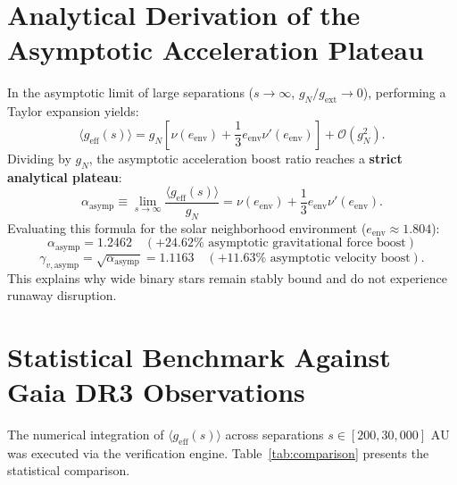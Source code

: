 \documentclass[11pt,a4paper]{article}
\begin{document}
\section{Analytical Derivation of the Asymptotic Acceleration Plateau}
In the asymptotic limit of large separations ($s \to \infty$, $g_N / g_{\mathrm{ext}} \to 0$), performing a Taylor expansion yields:
\begin{equation}
\langle g_{\mathrm{eff}}(s) \rangle = g_N \left[ \nu(e_{\mathrm{env}}) + \frac{1}{3} e_{\mathrm{env}} \nu'(e_{\mathrm{env}}) \right] + \mathcal{O}(g_N^2).
\end{equation}
Dividing by $g_N$, the asymptotic acceleration boost ratio reaches a \textbf{strict analytical plateau}:
\begin{equation}
\alpha_{\mathrm{asymp}} \equiv \lim_{s \to \infty} \frac{\langle g_{\mathrm{eff}}(s) \rangle}{g_N} = \nu(e_{\mathrm{env}}) + \frac{1}{3} e_{\mathrm{env}} \nu'(e_{\mathrm{env}}).
\end{equation}
Evaluating this formula for the solar neighborhood environment ($e_{\mathrm{env}} \approx 1.804$):
\begin{equation}
\alpha_{\mathrm{asymp}} = \mathbf{1.2462} \quad (+24.62\%\text{ asymptotic gravitational force boost})
\end{equation}
\begin{equation}
\gamma_{v,\mathrm{asymp}} = \sqrt{\alpha_{\mathrm{asymp}}} = \mathbf{1.1163} \quad (+11.63\%\text{ asymptotic velocity boost}).
\end{equation}
This explains why wide binary stars remain stably bound and do not experience runaway disruption.

\section{Statistical Benchmark Against Gaia DR3 Observations}
The numerical integration of $\langle g_{\mathrm{eff}}(s) \rangle$ across separations $s \in [200, 30,000]\text{ AU}$ was executed via the verification engine. Table~\ref{tab:comparison} presents the statistical comparison.
\end{document}
